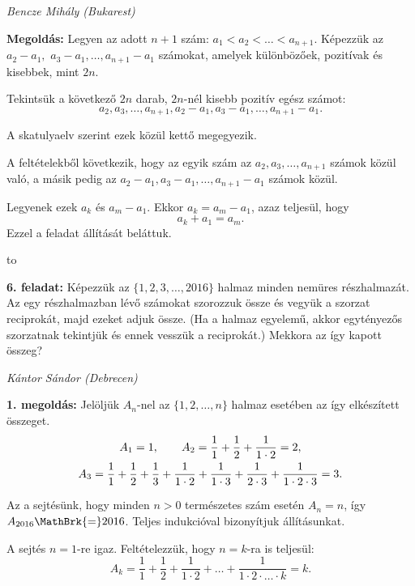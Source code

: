 \documentclass[a4paper,10pt]{article}
\newcommand{\ki}[2]{\hfill {\it #1 (#2)}\medskip}
\newcommand{\vonal}{\hbox to \hsize{\hskip2truecm\hrulefill\hskip2truecm}}
\begin{document}
\ki{Bencze Mihály}{Bukarest}\medskip

{\bf Megoldás: } Legyen az adott $n+1$ szám: $a_1<a_2<\ldots<a_{n+1}$. Képezzük az $a_2-a_1,$ $a_3-a_1, \ldots,a_{n+1}-a_1$ számokat, amelyek különbözőek, pozitívak és kisebbek, mint $2n$. 

\smallskip

\noindent Tekintsük a következő $2n$ darab, $2n$-nél kisebb pozitív egész számot:
\[ a_2, a_3, \ldots ,a_{n+1}, a_2-a_1, a_3-a_1,\ldots, a_{n+1}-a_1.\]

\noindent A skatulyaelv szerint ezek közül kettő megegyezik.

\smallskip

\noindent A feltételekből következik, hogy az egyik szám az $a_2,a_3,\ldots, a_{n+1}$ számok közül való, a másik pedig az $a_2-a_1, a_3-a_1,\ldots, a_{n+1}-a_1$ számok közül.

\smallskip

\noindent Legyenek ezek $a_k$ és $a_m-a_1$. Ekkor $a_k=a_m-a_1$, azaz teljesül, hogy
\[a_k+a_1=a_m.\]
Ezzel a feladat állítását beláttuk.


\vonal 

{\bf 6. feladat: } Képezzük az $\{1, 2, 3, \ldots, 2016\}$ halmaz minden nemüres részhalmazát. Az egy részhalmazban lévő számokat  szorozzuk össze  és vegyük a szorzat reciprokát, majd ezeket adjuk össze. (Ha a halmaz egyelemű, akkor egytényezős szorzatnak tekintjük és ennek vesszük a reciprokát.) Mekkora az így kapott összeg?

\ki{Kántor Sándor}{Debrecen}\medskip

{\bf 1. megoldás: } Jelöljük $A_n$-nel az $\{1, 2, \ldots , n\}$ halmaz esetében az így elkészített összeget.
\begin{gather}
A_1=1, \qquad A_2=\frac 1 1+\frac 1 2+\frac 1{1 \cdot 2}=2,\notag\\  
A_3=\frac 1 1+\frac 1 2+\frac 1 3+\frac 1 {1 \cdot 2}+\frac 1 {1 \cdot 3}+\frac 1 {2 \cdot 3}+\frac 1 {1 \cdot 2 \cdot 3}=3.
\end{gather} 


\smallskip

\noindent Az a sejtésünk, hogy minden $n>0$ természetes szám esetén $A_n=n$, így $A_{2016}\MathBrk{=}2016$.  Teljes indukcióval bizonyítjuk állításunkat. 

\smallskip

\noindent A sejtés $n=1$-re igaz. Feltételezzük, hogy $n=k$-ra is teljesül:
\[A_k=\frac 1 1+\frac 1 2+\frac 1 {1 \cdot 2}+\ldots+\frac1 {1\cdot2\cdot\ldots \cdot k}=k.\]
\end{document}

